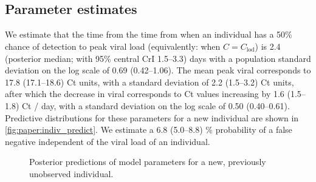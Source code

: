 \documentclass[thesis.tex]{subfiles}
\begin{document}
\subsection{Parameter estimates}

We estimate that the time from the time from when an individual has a 50\% chance of detection to peak viral load (equivalently: when $\hat{C} = C_\text{lod}$) is 2.4 (posterior median; with 95\% central CrI 1.5--3.3) days with a population standard deviation on the log scale of 0.69 (0.42--1.06).
The mean peak viral corresponds to 17.8 (17.1--18.6) Ct units, with a standard deviation of 2.2 (1.5--3.2) Ct units, after which the decrease in viral corresponds to Ct values increasing by 1.6 (1.5--1.8) Ct / day, with a standard deviation on the log scale of 0.50 (0.40--0.61).
Predictive distributions for these parameters for a new individual are shown in \autoref{fig:paper:indiv_predict}.
We estimate a 6.8 (5.0--8.8) \% probability of a false negative independent of the viral load of an individual.

\begin{figure}
    \centering
    \caption{Posterior predictions of model parameters for a new, previously unobserved individual.}
    \label{fig:paper:indiv_predict}
\end{figure}
\end{document}
